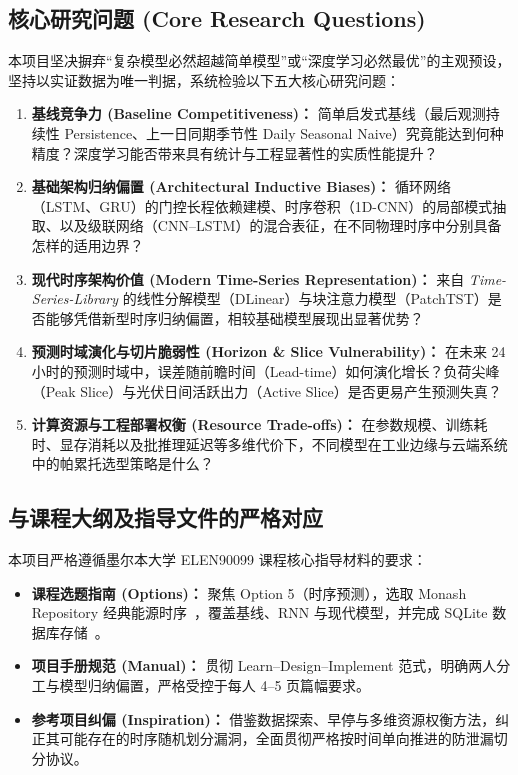 \documentclass[11pt,a4paper,UTF8]{ctexart}
\begin{document}
\subsection{核心研究问题 (Core Research Questions)}
本项目坚决摒弃“复杂模型必然超越简单模型”或“深度学习必然最优”的主观预设，坚持以实证数据为唯一判据，系统检验以下五大核心研究问题：
\begin{enumerate}
    \item \textbf{基线竞争力 (Baseline Competitiveness)：} 简单启发式基线（最后观测持续性 Persistence、上一日同期季节性 Daily Seasonal Naive）究竟能达到何种精度？深度学习能否带来具有统计与工程显著性的实质性能提升？
    \item \textbf{基础架构归纳偏置 (Architectural Inductive Biases)：} 循环网络（LSTM、GRU）的门控长程依赖建模、时序卷积（1D-CNN）的局部模式抽取、以及级联网络（CNN--LSTM）的混合表征，在不同物理时序中分别具备怎样的适用边界？
    \item \textbf{现代时序架构价值 (Modern Time-Series Representation)：} 来自 \textit{Time-Series-Library} 的线性分解模型（DLinear）与块注意力模型（PatchTST）是否能够凭借新型时序归纳偏置，相较基础模型展现出显著优势？
    \item \textbf{预测时域演化与切片脆弱性 (Horizon \& Slice Vulnerability)：} 在未来 24 小时的预测时域中，误差随前瞻时间（Lead-time）如何演化增长？负荷尖峰（Peak Slice）与光伏日间活跃出力（Active Slice）是否更易产生预测失真？
    \item \textbf{计算资源与工程部署权衡 (Resource Trade-offs)：} 在参数规模、训练耗时、显存消耗以及批推理延迟等多维代价下，不同模型在工业边缘与云端系统中的帕累托选型策略是什么？
\end{enumerate}

\subsection{与课程大纲及指导文件的严格对应}
本项目严格遵循墨尔本大学 ELEN90099 课程核心指导材料的要求：
\begin{itemize}
    \item \textbf{课程选题指南 (Options)：} 聚焦 Option 5（时序预测），选取 Monash Repository 经典能源时序~\cite{godahewa2021monash}，覆盖基线、RNN 与现代模型，并完成 SQLite 数据库存储~\cite{lim2021time}。
    \item \textbf{项目手册规范 (Manual)：} 贯彻 Learn--Design--Implement 范式，明确两人分工与模型归纳偏置，严格受控于每人 4--5 页篇幅要求。
    \item \textbf{参考项目纠偏 (Inspiration)：} 借鉴数据探索、早停与多维资源权衡方法，纠正其可能存在的时序随机划分漏洞，全面贯彻严格按时间单向推进的防泄漏切分协议。
\end{itemize}
\end{document}
